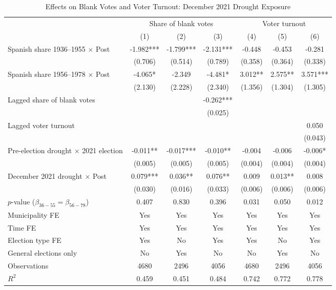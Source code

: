 \begin{table}[!htbp]
\caption{Effects on Blank Votes and Voter Turnout: December 2021 Drought Exposure}
\centering
\scriptsize
\renewcommand{\arraystretch}{1.15}
\setlength{\tabcolsep}{3pt}
\begin{tabular}{p{}cccccc}
\hline
 & \multicolumn{3}{c}{Share of blank votes} & \multicolumn{3}{c}{Voter turnout} \\
\cline{2-4}\cline{5-7}
 & (1) & (2) & (3) & (4) & (5) & (6) \\
\hline
Spanish share 1936--1955 $\times$ Post & -1.982*** & -1.799*** & -2.131*** & -0.448 & -0.453 & -0.281 \\
 & (0.706) & (0.514) & (0.789) & (0.358) & (0.364) & (0.338) \\
Spanish share 1956--1978 $\times$ Post & -4.065* & -2.349 & -4.481* & 3.012** & 2.575** & 3.571*** \\
 & (2.130) & (2.228) & (2.340) & (1.356) & (1.304) & (1.305) \\
Lagged share of blank votes &  &  & -0.262*** &  &  &  \\
 &  &  & (0.025) &  &  &  \\
Lagged voter turnout &  &  &  &  &  & 0.050 \\
 &  &  &  &  &  & (0.043) \\
Pre-election drought $\times$ 2021 election & -0.011** & -0.017*** & -0.010** & -0.004 & -0.006 & -0.006* \\
 & (0.005) & (0.005) & (0.005) & (0.004) & (0.004) & (0.004) \\
December 2021 drought $\times$ Post & 0.079*** & 0.036** & 0.076** & 0.009 & 0.013** & 0.008 \\
 & (0.030) & (0.016) & (0.033) & (0.006) & (0.006) & (0.006) \\
$p$-value ($\beta_{36{-}55}=\beta_{56{-}78}$) & 0.407 & 0.830 & 0.396 & 0.031 & 0.050 & 0.012 \\
Municipality FE & Yes & Yes & Yes & Yes & Yes & Yes \\
Time FE & Yes & Yes & Yes & Yes & Yes & Yes \\
Election type FE & Yes & No & Yes & Yes & No & Yes \\
General elections only & No & Yes & No & No & Yes & No \\

Observations & 4680 & 2496 & 4056 & 4680 & 2496 & 4056 \\
$R^2$ & 0.459 & 0.451 & 0.484 & 0.742 & 0.772 & 0.778 \\
\hline
\end{tabular}


\end{table}
